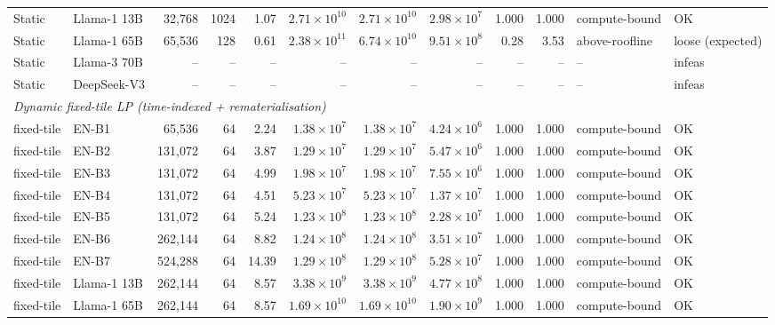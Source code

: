 \begin{table}[ht!]
{\begin{tabular}{llrrrrrrrrll}
Static & Llama-1 13B & 32{,}768  & 1024 & 1.07  & $2.71\times10^{10}$& $2.71\times10^{10}$& $2.98\times10^{7}$ & 1.000 & 1.000 & compute-bound   & OK \\
Static & Llama-1 65B & 65{,}536  & 128  & 0.61  & $2.38\times10^{11}$& $6.74\times10^{10}$& $9.51\times10^{8}$ & 0.28 & 3.53 & above-roofline  & loose (expected) \\
Static & Llama-3 70B & --         & --    & --     & --                   & --                   & --                   & --     & --     & --               & infeas \\
Static & DeepSeek-V3 & --         & --    & --     & --                   & --                   & --                   & --     & --     & --               & infeas \\
\midrule
\multicolumn{12}{l}{\textit{Dynamic fixed-tile LP (time-indexed + rematerialisation)}} \\
\midrule
fixed-tile & EN-B1       & 65{,}536  & 64  &  2.24 & $1.38\times10^{7}$ & $1.38\times10^{7}$ & $4.24\times10^{6}$ & 1.000 & 1.000 & compute-bound & OK \\
fixed-tile & EN-B2       & 131{,}072 & 64  &  3.87 & $1.29\times10^{7}$ & $1.29\times10^{7}$ & $5.47\times10^{6}$ & 1.000 & 1.000 & compute-bound & OK \\
fixed-tile & EN-B3       & 131{,}072 & 64  &  4.99 & $1.98\times10^{7}$ & $1.98\times10^{7}$ & $7.55\times10^{6}$ & 1.000 & 1.000 & compute-bound & OK \\
fixed-tile & EN-B4       & 131{,}072 & 64  &  4.51 & $5.23\times10^{7}$ & $5.23\times10^{7}$ & $1.37\times10^{7}$ & 1.000 & 1.000 & compute-bound & OK \\
fixed-tile & EN-B5       & 131{,}072 & 64  &  5.24 & $1.23\times10^{8}$ & $1.23\times10^{8}$ & $2.28\times10^{7}$ & 1.000 & 1.000 & compute-bound & OK \\
fixed-tile & EN-B6       & 262{,}144 & 64  &  8.82 & $1.24\times10^{8}$ & $1.24\times10^{8}$ & $3.51\times10^{7}$ & 1.000 & 1.000 & compute-bound & OK \\
fixed-tile & EN-B7       & 524{,}288 & 64  & 14.39 & $1.29\times10^{8}$ & $1.29\times10^{8}$ & $5.28\times10^{7}$ & 1.000 & 1.000 & compute-bound & OK \\
fixed-tile & Llama-1 13B & 262{,}144 & 64  &  8.57 & $3.38\times10^{9}$ & $3.38\times10^{9}$ & $4.77\times10^{8}$ & 1.000 & 1.000 & compute-bound & OK \\
fixed-tile & Llama-1 65B & 262{,}144 & 64  &  8.57 & $1.69\times10^{10}$& $1.69\times10^{10}$& $1.90\times10^{9}$ & 1.000 & 1.000 & compute-bound & OK \\

\end{tabular}}
\end{table}
